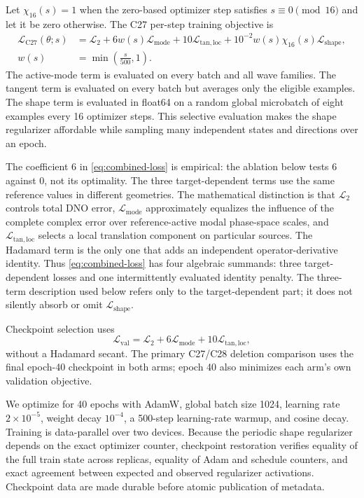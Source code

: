 Let $\chi_{16}(s)=1$ when the zero-based optimizer step satisfies
$s\equiv0\pmod{16}$ and let it be zero otherwise. The C27 per-step training
objective is
\begin{equation}
  \boxed{\begin{aligned}
  \mathcal L_{\mathrm{C27}}(\theta;s)
  &={\mathcal L}_2
  +6w(s)\mathcal L_{\mathrm{mode}}
  +10\mathcal L_{\mathrm{tan,loc}}
  +10^{-2}w(s)\chi_{16}(s)\mathcal L_{\mathrm{shape}},\\
  w(s)&=\min\left(\frac{s}{500},1\right).
  \end{aligned}}
  \label{eq:combined-loss}
\end{equation}
The active-mode term is evaluated on every batch and all wave families.  The
tangent term is evaluated on every batch but averages only the eligible
examples.  The shape term is evaluated in float64 on a random global
microbatch of eight examples every 16 optimizer steps. This
selective evaluation makes the shape regularizer affordable while sampling
many independent states and directions over an epoch.

The coefficient 6 in \eqref{eq:combined-loss} is empirical: the ablation below
tests 6 against 0, not its optimality.  The three target-dependent terms use
the same reference values in different geometries.  The mathematical distinction is
that $\mathcal L_2$ controls total DNO error,
$\mathcal L_{\mathrm{mode}}$ approximately equalizes the influence of the
complete complex error over reference-active modal phase-space scales, and
$\mathcal L_{\mathrm{tan,loc}}$ selects a local
translation component on particular sources.  The Hadamard term is the only
one that adds an independent operator-derivative identity.  Thus
\eqref{eq:combined-loss} has four algebraic summands: three target-dependent
losses and one intermittently evaluated identity penalty.  The three-term
description used below refers only to the target-dependent part; it does not
silently absorb or omit $\mathcal L_{\mathrm{shape}}$.

Checkpoint selection uses
\begin{equation}
  \mathcal L_{\mathrm{val}}
  =\mathcal L_2+6\mathcal L_{\mathrm{mode}}
   +10\mathcal L_{\mathrm{tan,loc}},
  \label{eq:c27-validation-loss}
\end{equation}
without a Hadamard secant. The primary C27/C28 deletion comparison uses the
final epoch-40 checkpoint in both arms; epoch 40 also minimizes each arm's own
validation objective.

We optimize for 40 epochs with AdamW, global batch size 1024, learning rate
$2\times10^{-5}$, weight decay $10^{-4}$, a 500-step learning-rate warmup, and
cosine decay. Training is data-parallel over two devices. Because the periodic
shape regularizer depends on the exact optimizer counter, checkpoint
restoration verifies equality of the full train state across replicas,
equality of Adam and schedule counters, and exact agreement between expected
and observed regularizer activations. Checkpoint data are made durable before
atomic publication of metadata.
